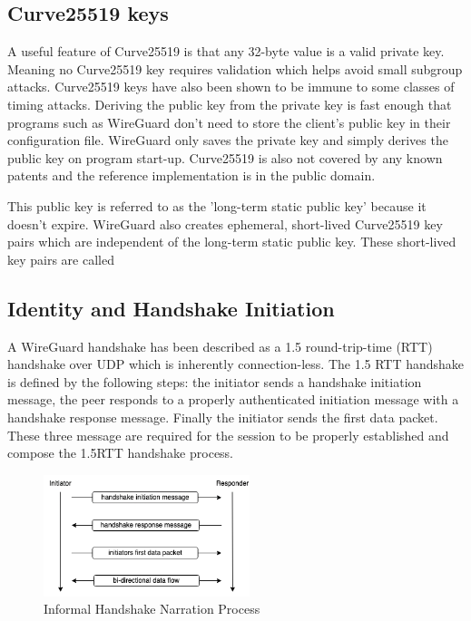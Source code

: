 \documentclass [11pt, proquest] {uwthesis}[2020/02/24]
\begin{document}
\subsection{Curve25519 keys}
A useful feature of Curve25519 is that any 32-byte value is a valid private key. Meaning no Curve25519 key requires validation which helps avoid small subgroup attacks. Curve25519 keys have also been shown to be immune to some classes of timing attacks\cite{noauthor_safecurves_2022}\cite{sasdrich_implementing_2015}.  Deriving the public key from the private key is fast enough that programs such as WireGuard don't need to store the client's public key in their configuration file. WireGuard only saves the private key and simply derives the public key on program start-up. Curve25519 is also not covered by any known patents and the reference implementation is in the public domain.

This public key is referred to as the 'long-term static public key' because it doesn't expire. WireGuard also creates ephemeral, short-lived Curve25519 key pairs which are independent of the long-term static public key. These short-lived key pairs are called 

\subsection {Identity and Handshake Initiation}

A WireGuard handshake has been described as a 1.5 round-trip-time (RTT) handshake over UDP which is inherently connection-less. The 1.5 RTT handshake is defined by the following steps: the initiator sends a handshake initiation message, the peer responds to a properly authenticated initiation message with a handshake response message. Finally the initiator sends the first data packet. These three message are required for the session to be properly established and compose the 1.5RTT handshake process.

\begin{figure}[ht]
\includegraphics[width=6cm]{paper/images/handshake_process.drawio.png}
\caption{Informal Handshake Narration Process}
\label{fig:handshake_process}
\end{figure}
\end{document}
